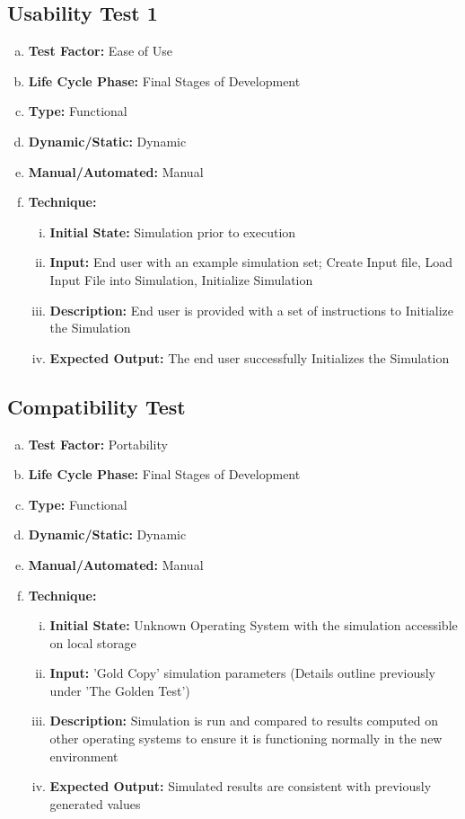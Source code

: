 \documentclass[paper=letter, fontsize=10pt]{scrartcl}
\numberwithin{equation}{section}		%
\numberwithin{figure}{section}			%
\numberwithin{table}{section}				%
\begin{document}
\subsection{Usability Test 1}
\begin{enumerate}[(a)]
	\item \textbf{Test Factor:} Ease of Use
	\item \textbf{Life Cycle Phase:} Final Stages of Development
	\item \textbf{Type:} Functional
	\item \textbf{Dynamic/Static:} Dynamic
	\item \textbf{Manual/Automated:} Manual
	\item \textbf{Technique:}
		\begin{enumerate}[(i)]
			\item \textbf{Initial State:} Simulation prior to execution  
			\item \textbf{Input:} End user with an example simulation set; Create Input file, Load Input File into Simulation, Initialize Simulation
			\item \textbf{Description:} End user is provided with a set of instructions to Initialize the Simulation 
			\item \textbf{Expected Output:} The end user successfully Initializes the Simulation
		\end{enumerate}
\end{enumerate}

\subsection{Compatibility Test}
\begin{enumerate}[(a)] 
	\item \textbf{Test Factor:} Portability 
	\item \textbf{Life Cycle Phase:} Final Stages of Development
	\item \textbf{Type:} Functional
	\item \textbf{Dynamic/Static:} Dynamic
	\item \textbf{Manual/Automated:} Manual
	\item \textbf{Technique:}
		\begin{enumerate}[(i)]
			\item \textbf{Initial State:} Unknown Operating System with the simulation accessible on local storage  
			\item \textbf{Input:} 'Gold Copy' simulation parameters (Details outline previously under 'The Golden Test')
			\item \textbf{Description:} Simulation is run and compared to results computed on other operating systems to ensure it is functioning normally in the new environment
			\item \textbf{Expected Output:} Simulated results are consistent with previously generated values
		\end{enumerate}
\end{enumerate}
\end{document}
